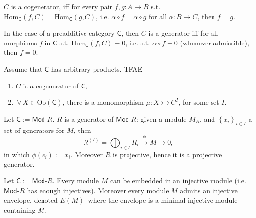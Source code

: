 \begin{rem}
	$C$ is a cogenerator, iff for every pair $f,g: A \to B$
	s.t. $\mathrm{Hom}_{\mathsf{C}} \left( f, C \right) = \mathrm{Hom}_{\mathsf{C}} \left( g, C \right)$,
	i.e. $\alpha \circ f = \alpha \circ g$ for all $\alpha: B \to C$, then $f = g$.

	In the case of a preadditive category $\mathsf{C}$, then $C$ is a generator iff
	for all morphisms $f$ in $\mathsf{C}$ s.t. $\mathrm{Hom}_{\mathsf{C}} \left( f, C \right) = 0$,
	i.e. s.t. $\alpha \circ f = 0$ (whenever admissible), then $f = 0$.
\end{rem}

\begin{prop}
	Assume that $\mathsf{C}$ has arbitrary products.
	TFAE
	\begin{enumerate}
		\item $C$ is a cogenerator of $\mathsf{C}$,
		\item $\,\forall\, X \in \mathrm{Ob} \left(\mathsf{C}\right)$, there is a monomorphism
			$\mu: X \rightarrowtail C^{I}$, for some set $I$.
	\end{enumerate}
\end{prop} 

\begin{ex}
	Let $\mathsf{C} := \mathsf{Mod}\text{-}R$.
	$R$ is a generator of $\mathsf{Mod}\text{-}R$:
	given a module $M_R$, and $\left\{ x_i \right\}_{i \in I}$ a set of generators for $M$, then
	\begin{equation}
		R^{(I)} = \bigoplus_{i \in I} R_i \xrightarrow{\phi} M \to 0
	,\end{equation} 
	in which $\phi(e_i) := x_i$.
	Moreover $R$ is projective, hence it is a projective generator.
\end{ex} 

\begin{rem}
	Let $\mathsf{C} := \mathsf{Mod}\text{-}R$.
	Every module $M$ can be embedded in an injective module
	(i.e. $\mathsf{Mod}\text{-}R$ has enough injectives).
	Moreover every module $M$ admits an injective envelope, denoted $E(M)$,
	where the envelope is a minimal injective module containing $M$.
\end{rem}

